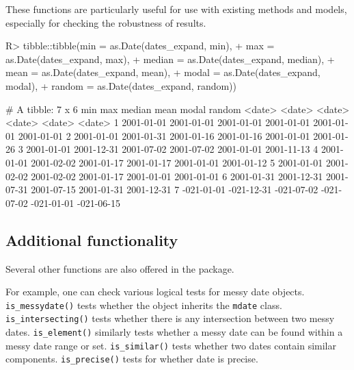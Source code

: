 \documentclass[
]{jss}
\begin{document}
These functions are particularly useful for use with existing methods
and models, especially for checking the robustness of results.

\begin{CodeChunk}
\begin{CodeInput}
R> tibble::tibble(min = as.Date(dates_expand, min),
+                max = as.Date(dates_expand, max),
+                median = as.Date(dates_expand, median),
+                mean = as.Date(dates_expand, mean),
+                modal = as.Date(dates_expand, modal),
+                random = as.Date(dates_expand, random))
\end{CodeInput}
\begin{CodeOutput}
# A tibble: 7 x 6
  min        max        median     mean       modal      random    
  <date>     <date>     <date>     <date>     <date>     <date>    
1 2001-01-01 2001-01-01 2001-01-01 2001-01-01 2001-01-01 2001-01-01
2 2001-01-01 2001-01-31 2001-01-16 2001-01-16 2001-01-01 2001-01-26
3 2001-01-01 2001-12-31 2001-07-02 2001-07-02 2001-01-01 2001-11-13
4 2001-01-01 2001-02-02 2001-01-17 2001-01-17 2001-01-01 2001-01-12
5 2001-01-01 2001-02-02 2001-02-02 2001-01-17 2001-01-01 2001-01-01
6 2001-01-31 2001-12-31 2001-07-31 2001-07-15 2001-01-31 2001-12-31
7 -021-01-01 -021-12-31 -021-07-02 -021-07-02 -021-01-01 -021-06-15
\end{CodeOutput}
\end{CodeChunk}

\hypertarget{additional-functionality}{%
\subsection{Additional functionality}\label{additional-functionality}}

Several other functions are also offered in the 
package.

For example, one can check various logical tests for messy date objects.
\texttt{is\_messydate()} tests whether the object inherits the
\texttt{mdate} class. \texttt{is\_intersecting()} tests whether there is
any intersection between two messy dates. \texttt{is\_element()}
similarly tests whether a messy date can be found within a messy date
range or set. \texttt{is\_similar()} tests whether two dates contain
similar components. \texttt{is\_precise()} tests for whether date is
precise.
\end{document}
